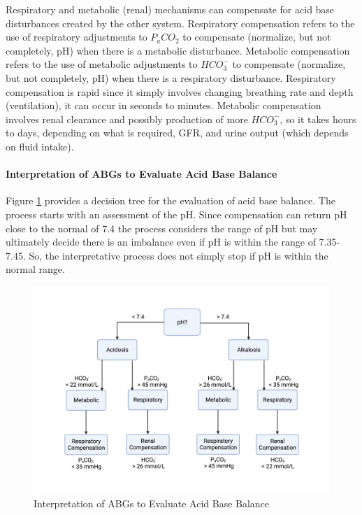 Respiratory and metabolic (renal) mechanisms can compensate for acid base disturbances created by the other system. Respiratory compensation refers to the use of respiratory adjustments to $P_aCO_2$ to compensate (normalize, but not completely, pH) when there is a metabolic disturbance. Metabolic compensation refers to the use of metabolic adjustments to $HCO_3^-$ to compensate (normalize, but not completely, pH) when there is a respiratory disturbance. Respiratory compensation is rapid since it simply involves changing breathing rate and depth (ventilation), it can occur in seconds to minutes. Metabolic compensation involves renal clearance and possibly production of more $HCO_3^-$, so it takes hours to days, depending on what is required, GFR, and urine output (which depends on fluid intake).

\paragraph{Interpretation of ABGs to Evaluate Acid Base Balance}

Figure \ref{fig:ABGs} provides a decision tree for the evaluation of acid base balance. The process starts with an assessment of the pH. Since compensation can return pH close to the normal of 7.4 the process considers the range of pH but may ultimately decide there is an imbalance even if pH is within the range of 7.35-7.45. So, the interpretative process does not simply stop if pH is within the normal range.


\begin{figure}[!h]
    \centering
    \includegraphics[width=1.0\linewidth]{./figure/ABGs.png}
    \caption{Interpretation of ABGs to Evaluate Acid Base Balance}
    \label{fig:ABGs}
\end{figure}

